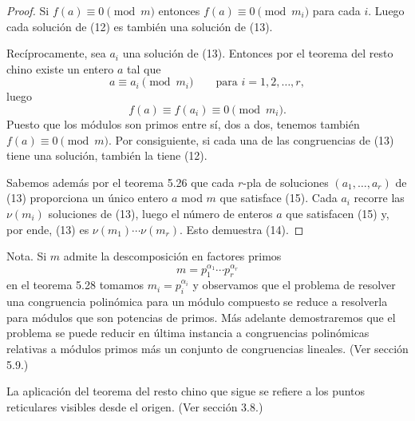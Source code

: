 \documentclass[12pt,a4paper]{book}
\begin{document}
    \begin{proof}
        Si $f(a)\equiv0\pmod{m}$ entonces $f(a)\equiv0\pmod{m_{i}}$ para cada $i$. Luego cada
        solución de (12) es también una solución de (13).

        Recíprocamente, sea $a_{i}$ una solución de (13). Entonces por el teorema del resto
        chino existe un entero $a$ tal que
        \begin{equation}
            a\equiv a_{i}\pmod{m_{i}}\qquad\text{para }i=1,2,\dots,r,
        \end{equation}
        luego
        \begin{equation*}
            f(a)\equiv f(a_{i})\equiv0\pmod{m_{i}}.
        \end{equation*}
        Puesto que los módulos son primos entre sí, dos a dos, tenemos también
        $f(a)\equiv0\pmod{m}$. Por consiguiente, si cada una de las congruencias de (13)
        tiene una solución, también la tiene (12).

        Sabemos además por el teorema 5.26 que cada $r$-pla de soluciones $(a_{1},\dots,a_{r})$
        de (13) proporciona un único entero $a$ mod $m$ que satisface (15). Cada $a_{i}$
        recorre las $\nu(m_{i})$ soluciones de (13), luego el número de enteros $a$ que
        satisfacen (15) y, por ende, (13) es $\nu(m_{1})\cdots\nu(m_{r})$. Esto demuestra
        (14).
    \end{proof}

    Nota. Si $m$ admite la descomposición en factores primos
    \begin{equation*}
        m=p_{1}^{\alpha_{1}}\cdots p_{r}^{\alpha_{r}}
    \end{equation*}
    en el teorema 5.28 tomamos $m_{i}=p_{i}^{\alpha_{i}}$ y observamos que el problema de
    resolver una congruencia polinómica para un módulo compuesto se reduce a resolverla
    para módulos que son potencias de primos. Más adelante demostraremos que el problema
    se puede reducir en última instancia a congruencias polinómicas relativas a módulos
    primos más un conjunto de congruencias lineales. (Ver sección 5.9.)

    La aplicación del teorema del resto chino que sigue se refiere a los puntos
    reticulares visibles desde el origen. (Ver sección 3.8.)
\end{document}
